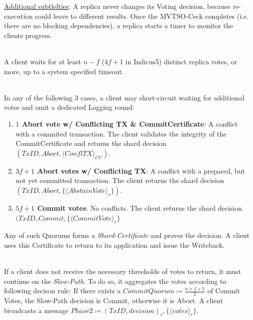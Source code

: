 \underline{Additional subtlelties}: 
A replica never changes its Voting decision, because re-execution could leave to different results. Once the MVTSO-Ceck completes (i.e. there are no blocking dependencies), a replica starts a timer to monitor the clients progress.

\\
A client waits for at least $n-f$ ($4f+1$ in Indicus5) distinct replica votes, or more, up to a system specified timeout. 

\\
In any of the following 3 cases, a client may short-circuit waiting for additional votes and omit a dedicated Logging round:
\begin{enumerate}
\item \textbf{$1$ Abort vote w/ Conflicting TX \& CommitCertificate}: A conflict with a commited transaction. The client validates the integrity of the CommitCertificate and returns the shard decision $(TxID, Abort, \langle ConflTX \rangle_{CC})$. 
\item \textbf{$3f+1$ Abort votes w/ Conflicting TX}: A conflict with a prepared, but not yet committed transaction. The client returns the shard decision $(TxID, Abort, \{\langle AbstainVote\rangle_r\})$. 
\item \textbf{$5f+1$ Commit votes}: No conflicts. The client returns the shard decision $(TxID, Commit, \{\langle CommitVote \rangle_r\}$
\end{enumerate}
Any of such Quorums forms a \textit{Shard-Certificate} and proves the decision. A client uses this Certificate to return to its application and issue the Writeback.

\\
If a client does not receive the necessary thresholds of votes to return, it must continue on the \textit{Slow-Path}. To do so, it aggregates the votes according to following decison rule:
If there exists a $CommitQuorum \coloneqq \frac{n+f+1}{2}$ of Commit Votes, the Slow-Path decision is Commit, otherwise it is Abort.
A client broadcasts a message $Phase2 \coloneqq (TxID, decision)_c, \{\langle votes \rangle_r\}$.

